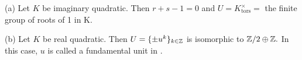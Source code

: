 \documentclass[10pt,a4paper,reqno]{amsart}
\begin{document}
\begin{egs}
(a) Let $K$ be imaginary quadratic. Then $r+s-1 = 0$ and $U =
K^{\times}_{\mathrm{tors}} = $ the finite group of roots of 1 in K.

(b) Let $K$ be real quadratic. Then $U = \{\pm u^k\}_{k\in \mathbb{Z}}$ is isomorphic
to $\mathbb{Z}/2 \oplus \mathbb{Z}.$ In this case, $u$ is called a fundamental unit in \OK.
\end{egs}


\end{document}
